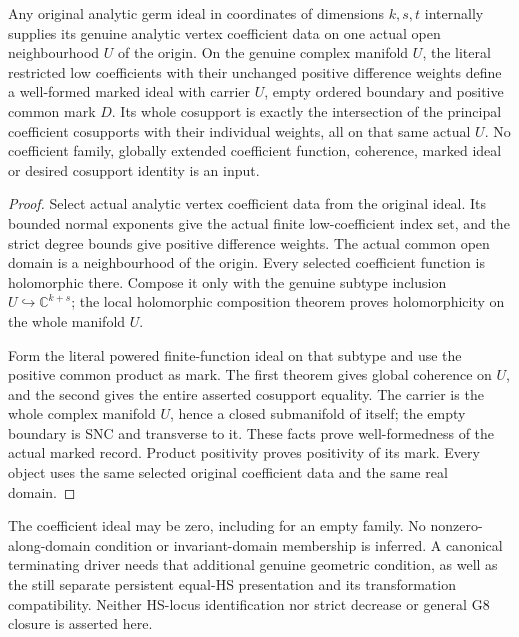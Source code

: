 \begin{theorem}
\label{hir:actual-original-coherent-weighted-coefficient-marked}
\leanok
Any original analytic germ ideal in coordinates of dimensions $k,s,t$
internally supplies its genuine analytic vertex coefficient data on one
actual open neighbourhood $U$ of the origin. On the genuine complex
manifold $U$, the literal restricted low coefficients with their unchanged
positive difference weights define a well-formed marked ideal with carrier
$U$, empty ordered boundary and positive common mark $D$. Its whole
cosupport is exactly the intersection of the principal coefficient
cosupports with their individual weights, all on that same actual $U$.
No coefficient family, globally extended coefficient function, coherence,
marked ideal or desired cosupport identity is an input.
\end{theorem}
\begin{proof}
Select actual analytic vertex coefficient data from the original ideal.
Its bounded normal exponents give the actual finite low-coefficient index
set, and the strict degree bounds give positive difference weights. The
actual common open domain is a neighbourhood of the origin. Every selected
coefficient function is holomorphic there. Compose it only with the genuine
subtype inclusion $U\hookrightarrow\mathbb C^{k+s}$; the local holomorphic
composition theorem proves holomorphicity on the whole manifold $U$.

Form the literal powered finite-function ideal on that subtype and use the
positive common product as mark. The first theorem gives global coherence
on $U$, and the second gives the entire asserted cosupport equality.
The carrier is the whole complex manifold $U$, hence a closed submanifold
of itself; the empty boundary is SNC and transverse to it. These facts
prove well-formedness of the actual marked record. Product positivity
proves positivity of its mark. Every object uses the same selected original
coefficient data and the same real domain.
\end{proof}

The coefficient ideal may be zero, including for an empty family. No
nonzero-along-domain condition or invariant-domain membership is inferred.
A canonical terminating driver needs that additional genuine geometric
condition, as well as the still separate persistent equal-HS presentation
and its transformation compatibility. Neither HS-locus identification nor
strict decrease or general G8 closure is asserted here.
